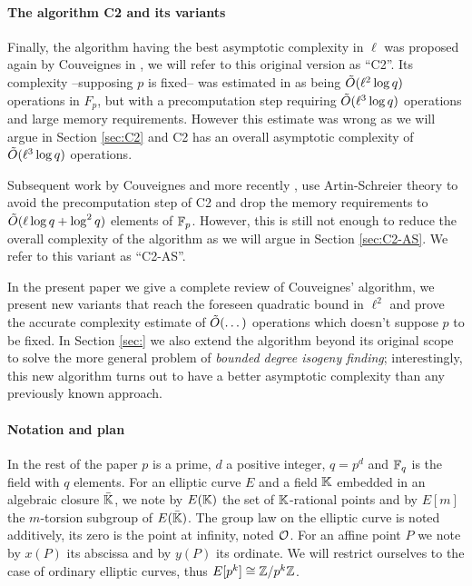 \paragraph{The algorithm C2 and its variants}
Finally, the algorithm having the best asymptotic complexity in $\ell$
was proposed again by Couveignes in \cite{Cou96}, we will refer to
this original version as ``C2''. Its complexity --supposing $p$ is
fixed-- was estimated in \cite{Cou96} as being $\tilde{O}(\ell^2\log q)$
operations in $F_p$, but with a precomputation step requiring
$\tilde{O}(\ell^3\log q)$ operations and large memory
requirements. However this estimate was wrong as we will argue in
Section \ref{sec:C2} and C2 has an overall asymptotic complexity of
$\tilde{O}(\ell^3\log q)$ operations.

Subsequent work by Couveignes \cite{Cou00} and more recently
\cite{DFS09}, use Artin-Schreier theory to avoid the precomputation
step of C2 and drop the memory requirements to $\tilde{O}(\ell\log q +
\log^2 q)$ elements of $\mathbb{F}_p$. However, this is still not enough to
reduce the overall complexity of the algorithm as we will argue in
Section \ref{sec:C2-AS}. We refer to this variant as ``C2-AS''.

In the present paper we give a complete review of Couveignes'
algorithm, we present new variants that reach the foreseen quadratic
bound in $\ell^2$ and prove the accurate complexity estimate of
$\tilde{O}(\dots)$ operations which doesn't suppose $p$ to be
fixed. In Section \ref{sec:} we also extend the algorithm beyond its
original scope to solve the more general problem of \emph{bounded
  degree isogeny finding}; interestingly, this new algorithm turns out
to have a better asymptotic complexity than any previously known
approach.

\paragraph{Notation and plan}
In the rest of the paper $p$ is a prime, $d$ a positive integer,
$q=p^d$ and $\mathbb{F}_q$ is the field with $q$ elements. For an elliptic
curve $E$ and a field $\mathbb{K}$ embedded in an algebraic closure
$\bar{\mathbb{K}}$, we note by $E(\mathbb{K})$ the set of $\mathbb{K}$-rational points and by
$E[m]$ the $m$-torsion subgroup of $E(\bar{\mathbb{K}})$. The group law on
the elliptic curve is noted additively, its zero is the point at
infinity, noted $\mathcal{O}$. For an affine point $P$ we note by $x(P)$ its
abscissa and by $y(P)$ its ordinate. We will restrict ourselves to the
case of ordinary elliptic curves, thus $E[p^k]\cong\mathbb{Z}/p^k\mathbb{Z}$.

